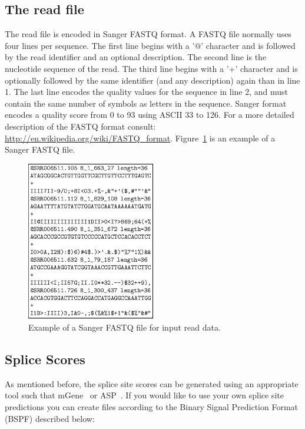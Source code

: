 \documentclass{article}
\begin{document}
\subsection{The read file}
\label{sec:readfile}

The read file is encoded in Sanger FASTQ format. A FASTQ file normally
uses four lines per sequence. The first line begins with a '@'
character and is followed by the read identifier and an optional
description. The second line is the nucleotide sequence of the
read. The third line begins with a '+' character and is optionally
followed by the same identifier (and any description) again than in
line 1. The last line encodes the quality values for the sequence in
line 2, and must contain the same number of symbols as letters in the
sequence. Sanger format encodes a quality score from 0 to 93 using ASCII
33 to 126. For a more detailed description of the FASTQ format consult:
\url{http://en.wikipedia.org/wiki/FASTQ_format}. Figure~\ref{fig:fastq}
is an example of a Sanger FASTQ file.

\begin{figure}[h!]
\begin{center}
\includegraphics[width=0.5\textwidth]{ReadFile.jpg}
\end{center}
\caption{Example of a Sanger FASTQ file for input read data.}
\label{fig:fastq}
\end{figure}

\subsection{Splice Scores}
\label{sec:splicescoresfile}

As mentioned before, the splice site scores can be generated using an
appropriate tool such that
mGene~\cite{Schweikertetal09,Schweikertetal09b} or
ASP~\cite{Sonnenburgetal07}. If you would like to use your own splice
site predictions you can create files according to the Binary Signal 
Prediction Format (BSPF) described below: 
\end{document}
